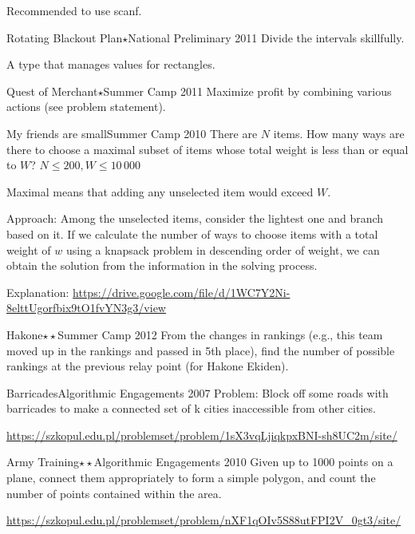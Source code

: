 Recommended to use scanf.

\begin{pbox}{Rotating Blackout Plan$\star$}{National Preliminary 2011}
Divide the intervals skillfully.

\end{pbox}

A type that manages values for rectangles.

\begin{pbox}{Quest of Merchant$\star$}{Summer Camp 2011}
Maximize profit by combining various actions (see problem statement).

\end{pbox}

\begin{pbox}{My friends are small}{Summer Camp 2010}
There are $N$ items. How many ways are there to choose a maximal subset of items whose total weight is less than or equal to $W$? $N \le 200, W \le 10\,000$
\end{pbox}

Maximal means that adding any unselected item would exceed $W$.

Approach: Among the unselected items, consider the lightest one and branch based on it. If we calculate the number of ways to choose items with a total weight of $w$ using a knapsack problem in descending order of weight, we can obtain the solution from the information in the solving process.

Explanation: \url{https://drive.google.com/file/d/1WC7Y2Ni-8elttUgorfbix9tO1fvYN3g3/view}

\begin{pbox}{Hakone$\star\star$}{Summer Camp 2012}
From the changes in rankings (e.g., this team moved up in the rankings and passed in 5th place), find the number of possible rankings at the previous relay point (for Hakone Ekiden).

\end{pbox}

\begin{pbox}{Barricades}{Algorithmic Engagements 2007}
Problem: Block off some roads with barricades to make a connected set of k cities inaccessible from other cities.

\url{https://szkopul.edu.pl/problemset/problem/1sX3vqLjiqkpxBNI-sh8UC2m/site/}
\end{pbox}

\begin{pbox}{Army Training$\star\star$}{Algorithmic Engagements 2010}
Given up to 1000 points on a plane, connect them appropriately to form a simple polygon, and count the number of points contained within the area.

\url{https://szkopul.edu.pl/problemset/problem/nXF1qOIv5S88utFPI2V_0gt3/site/}
\end{pbox}
